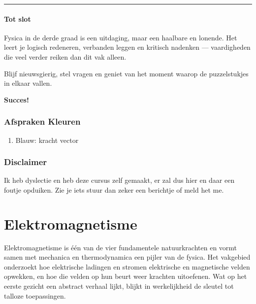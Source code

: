{\begin{center}
\rule{0.6\textwidth}{0.4pt}
\end{center}

\subsection*{Tot slot}

\begin{opm}
Fysica in de derde graad is een uitdaging, maar een haalbare en lonende.  
Het leert je logisch redeneren, verbanden leggen en kritisch nadenken — vaardigheden die veel verder reiken dan dit vak alleen.  
\end{opm}

Blijf nieuwsgierig, stel vragen en geniet van het moment waarop de puzzelstukjes in elkaar vallen.  
\begin{center}
\textbf{Succes!}
\end{center}

\section*{Afspraken Kleuren}
\begin{enumerate}
\item Blauw: kracht vector
\end{enumerate}

\section*{Disclaimer}
Ik heb dyslectie en heb deze cursus zelf gemaakt, er zal dus hier en daar een foutje opduiken. Zie je iets stuur dan zeker een berichtje of meld het me.
\mainmatter %
\part{Elektromagnetisme} %
\vspace{3mm}
Elektromagnetisme is één van de vier fundamentele natuurkrachten en vormt samen met mechanica en thermodynamica een pijler van de fysica. Het vakgebied onderzoekt hoe elektrische ladingen en stromen elektrische en magnetische velden opwekken, en hoe die velden op hun beurt weer krachten uitoefenen. Wat op het eerste gezicht een abstract verhaal lijkt, blijkt in werkelijkheid de sleutel tot talloze toepassingen.

}

